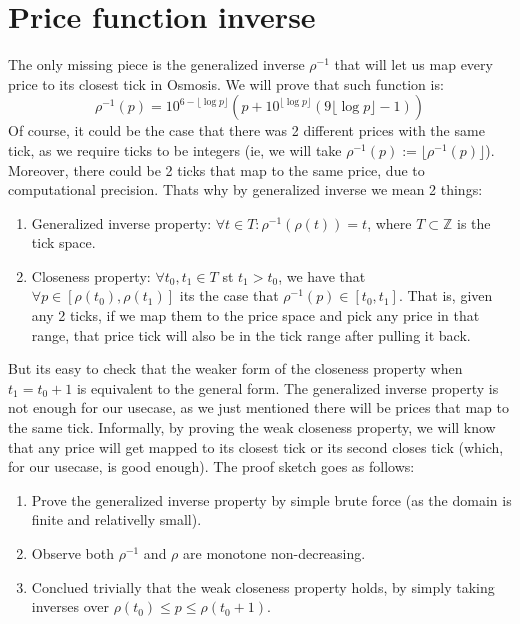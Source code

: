 \documentclass[11pt]{article}
\begin{document}
\section{Price function inverse}
The only missing piece is the generalized inverse $\rho^{-1}$ that will let
us map every price to its closest tick in Osmosis. We will prove that such
function is:
\[
\rho^{-1}(p) = 10^{6-\lfloor\log p\rfloor} \left(
	p+10^{\lfloor\log p\rfloor}\left(
		9\lfloor\log p\rfloor-1
	\right)
\right)
\]
Of course, it could be the case that there was 2 different prices with the same
tick, as we require ticks to be integers (ie, we will take $\rho^{-1}(p) :=
\lfloor \rho^{-1}(p)\rfloor$). Moreover, there could be 2 ticks that map to the
same price, due to computational precision. Thats why by generalized inverse we
mean 2 things:
\begin{enumerate}
    \item Generalized inverse property: $\forall t\in T: \rho^{-1}(\rho(t)) =
        t$, where $T\subset\mathbb Z$ is the tick space.
    \item Closeness property: $\forall t_0, t_1\in T$ st $t_1 > t_0$, we have
        that $\forall p\in [\rho(t_0), \rho(t_1)]$ its the case that
        $\rho^{-1}(p)\in[t_0, t_1]$. That is, given any 2 ticks, if we map them
        to the price space and pick any price in that range, that price tick will
        also be in the tick range after pulling it back.
\end{enumerate}
But its easy to check that the weaker form of the closeness property when $t_1
= t_0 + 1$ is equivalent to the general form. The generalized inverse property
is not enough for our usecase, as we just mentioned there will be prices that
map to the same tick. Informally, by proving the weak closeness
property, we will know that any price will get mapped to its closest tick or
its second closes tick (which, for our usecase, is good enough). The proof
sketch goes as follows:
\begin{enumerate}
    \item Prove the generalized inverse property by simple brute force (as the
        domain is finite and relativelly small).
    \item Observe both $\rho^{-1}$ and $\rho$ are monotone non-decreasing.
    \item Conclued trivially that the weak closeness property holds, by simply
        taking inverses over $\rho(t_0) \leq p \leq \rho(t_0 + 1)$.
\end{enumerate}
\end{document}
